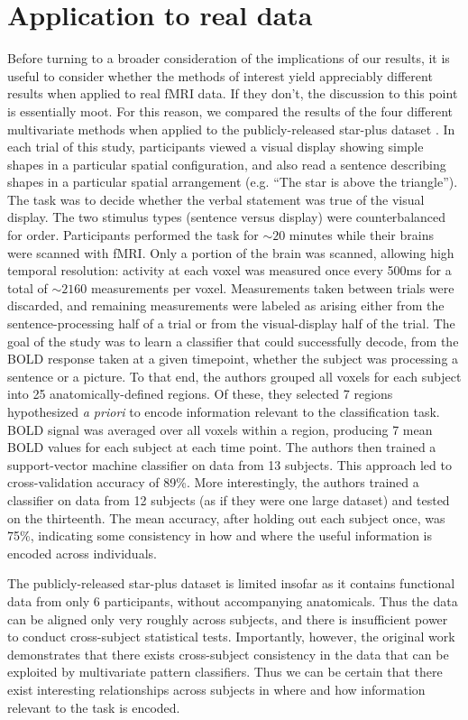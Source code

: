 \section{Application to real data}

Before turning to a broader consideration of the implications of our results, it is useful to consider whether the methods of interest yield appreciably different results when applied to real fMRI data. If they don't, the discussion to this point is essentially moot. For this reason, we compared the results of the four different multivariate methods when applied to the publicly-released star-plus dataset \cite{mitchell_learning_2004}. In each trial of this study, participants viewed a visual display showing simple shapes in a particular spatial configuration, and also read a sentence describing shapes in a particular spatial arrangement (e.g. ``The star is above the triangle''). The task was to decide whether the verbal statement was true of the visual display. The two stimulus types (sentence versus display) were counterbalanced for order. Participants performed the task for $\sim20$ minutes while their brains were scanned with fMRI. Only a portion of the brain was scanned, allowing high temporal resolution: activity at each voxel was measured once every 500ms for a total of $\sim2160$ measurements per voxel. Measurements taken between trials were discarded, and remaining measurements were labeled as arising either from the sentence-processing half of a trial or from the visual-display half of the trial. The goal of the study was to learn a classifier that could successfully decode, from the BOLD response taken at a given timepoint, whether the subject was processing a sentence or a picture. To that end, the authors grouped all voxels for each subject into 25 anatomically-defined regions. Of these, they selected 7 regions hypothesized {\em a priori} to encode information relevant to the classification task. BOLD signal was averaged over all voxels within a region, producing 7 mean BOLD values for each subject at each time point. The authors then trained a support-vector machine classifier on data from 13 subjects. This approach led to cross-validation accuracy of 89\%. More interestingly, the authors  trained a classifier on data from 12 subjects (as if they were one large dataset) and tested on the thirteenth. The mean accuracy, after holding out each subject once, was 75\%, indicating some consistency in how and where the useful information is encoded across individuals.

The publicly-released star-plus dataset is limited insofar as it contains functional data from only 6 participants, without accompanying anatomicals. Thus the data can be aligned only very roughly across subjects, and there is insufficient power to conduct cross-subject statistical tests. Importantly, however, the original work demonstrates that there exists cross-subject consistency in the data that can be exploited by multivariate pattern classifiers. Thus we can be certain that there exist interesting relationships across subjects in where and how information relevant to the task is encoded.

